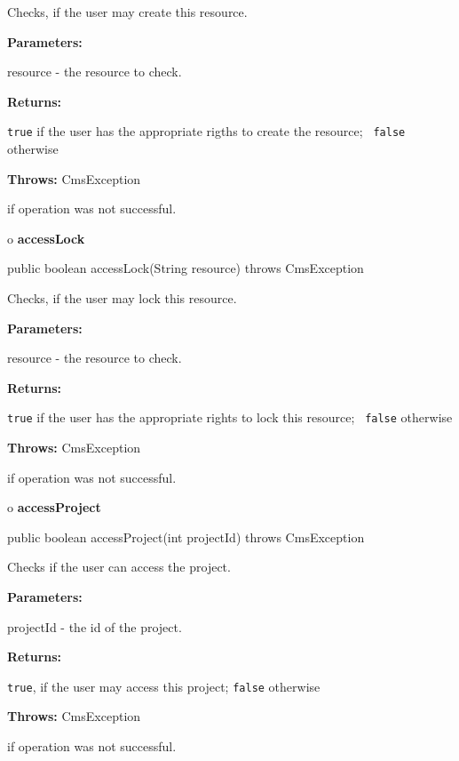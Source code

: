\begin{description}
\htmlDD Checks, if the user may create this resource. 

\begin{description}
\item {\bf Parameters:}  

resource - the resource to check.  
\item {\bf Returns:}  

{\tt true} if the user has the appropriate rigths to create the resource; {\tt
false} otherwise  
\item {\bf Throws:} CmsException  

if operation was not successful.  
\end{description}

\end{description}

o {\bf accessLock} 

\begin{PRE}
 public boolean accessLock(String resource) throws CmsException
\end{PRE}

\begin{description}
\htmlDD Checks, if the user may lock this resource. 

\begin{description}
\item {\bf Parameters:}  

resource - the resource to check.  
\item {\bf Returns:}  

{\tt true} if the user has the appropriate rights to lock this resource; {\tt
false} otherwise  
\item {\bf Throws:} CmsException  

if operation was not successful.  
\end{description}

\end{description}

o {\bf accessProject} 

\begin{PRE}
 public boolean accessProject(int projectId) throws CmsException
\end{PRE}

\begin{description}
\htmlDD Checks if the user can access the project. 

\begin{description}
\item {\bf Parameters:}  

projectId - the id of the project.  
\item {\bf Returns:}  

{\tt true}, if the user may access this project; {\tt false} otherwise  
\item {\bf Throws:} CmsException  

if operation was not successful.  
\end{description}

\end{description}

